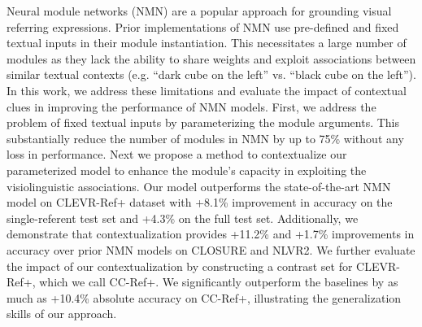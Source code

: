 Neural module networks (NMN) are a popular approach for grounding visual referring expressions. Prior implementations of NMN use pre-defined and fixed textual inputs in their module instantiation. This necessitates a large number of modules as they lack the ability to share weights and exploit associations between similar textual contexts (e.g. ``dark cube on the left'' vs. ``black cube on the left''). In this work, we address these limitations and evaluate the impact of contextual clues in improving the performance of NMN models. First, we address the problem of fixed textual inputs by parameterizing the module  arguments. This substantially reduce the number of modules in NMN by up to 75\% without any loss in performance. Next we propose a method to contextualize our parameterized model to enhance the module's capacity in exploiting the visiolinguistic associations. Our model outperforms the state-of-the-art NMN model on CLEVR-Ref+ dataset with +8.1\% improvement in accuracy on the single-referent test set and +4.3\% on the full test set. Additionally, we demonstrate that contextualization provides +11.2\% and +1.7\% improvements in accuracy over prior NMN models on CLOSURE and NLVR2. We further evaluate the impact of our contextualization by constructing a contrast set for CLEVR-Ref+, which we call CC-Ref+.  We significantly outperform the baselines by as much as +10.4\% absolute accuracy on CC-Ref+, illustrating the generalization skills of our approach.
